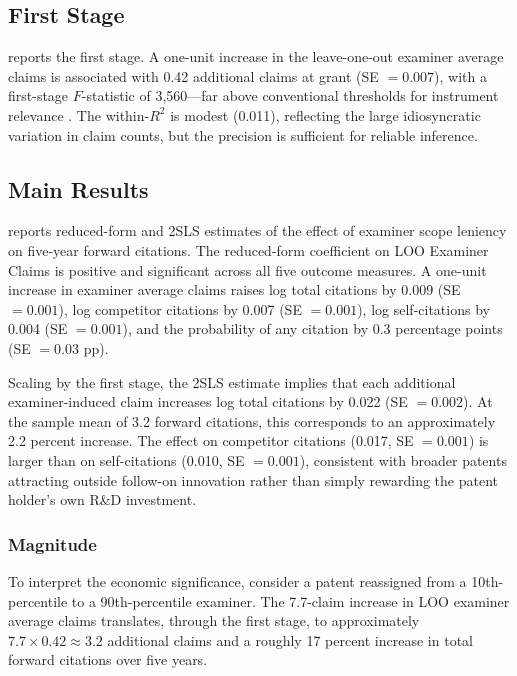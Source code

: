 \documentclass[12pt]{article}
\begin{document}
\subsection{First Stage}

 reports the first stage. A one-unit increase in the leave-one-out examiner average claims is associated with 0.42 additional claims at grant (SE $= 0.007$), with a first-stage $F$-statistic of 3,560---far above conventional thresholds for instrument relevance \citep{staiger1997}. The within-$R^2$ is modest (0.011), reflecting the large idiosyncratic variation in claim counts, but the precision is sufficient for reliable inference.



\subsection{Main Results}

 reports reduced-form and 2SLS estimates of the effect of examiner scope leniency on five-year forward citations. The reduced-form coefficient on LOO Examiner Claims is positive and significant across all five outcome measures. A one-unit increase in examiner average claims raises log total citations by 0.009 (SE $= 0.001$), log competitor citations by 0.007 (SE $= 0.001$), log self-citations by 0.004 (SE $= 0.001$), and the probability of any citation by 0.3 percentage points (SE $= 0.03$ pp).



Scaling by the first stage, the 2SLS estimate implies that each additional examiner-induced claim increases log total citations by 0.022 (SE $= 0.002$). At the sample mean of 3.2 forward citations, this corresponds to an approximately 2.2 percent increase. The effect on competitor citations (0.017, SE $= 0.001$) is larger than on self-citations (0.010, SE $= 0.001$), consistent with broader patents attracting outside follow-on innovation rather than simply rewarding the patent holder's own R\&D investment.

\subsubsection*{Magnitude} To interpret the economic significance, consider a patent reassigned from a 10th-percentile to a 90th-percentile examiner. The 7.7-claim increase in LOO examiner average claims translates, through the first stage, to approximately $7.7 \times 0.42 \approx 3.2$ additional claims and a roughly 17 percent increase in total forward citations over five years.
\end{document}
